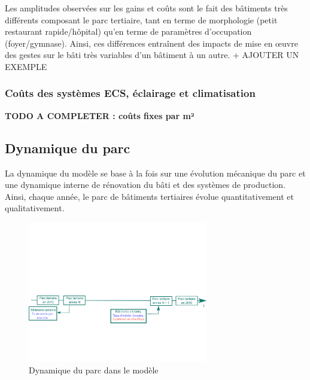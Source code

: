 \documentclass[10.5pt,a4paper]{article}
\begin{document}
{%


Les amplitudes observées sur les gains et coûts sont le fait des bâtiments très différents composant le parc tertiaire, tant en terme de morphologie (petit restaurant rapide/hôpital) qu’en terme de paramètres d’occupation (foyer/gymnase). Ainsi, ces différences entraînent des impacts de mise en œuvre des gestes sur le bâti très variables d’un bâtiment à un autre.
+ AJOUTER UN EXEMPLE

\subsubsection{Coûts des systèmes ECS, éclairage et climatisation}

\textbf{TODO A COMPLETER :  coûts fixes par m²}

\newpage 
\clearpage
\subsection{Dynamique du parc}

La dynamique du modèle se base à la fois sur une évolution mécanique du parc et une dynamique interne de rénovation du bâti et des systèmes de production. Ainsi, chaque année, le parc de bâtiments tertiaires évolue quantitativement et qualitativement.

\begin{figure}[h!]
\centering
\caption{Dynamique du parc dans le modèle }\label{schema_dyn}

\includegraphics[width = 0.7\textwidth]{schema_dyn}  


\end{figure}}
\end{document}
